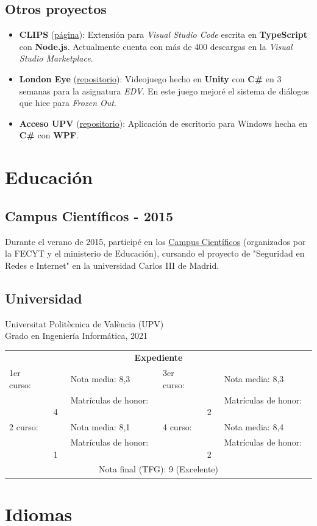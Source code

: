 \documentclass[letterpaper, 12pt, dvipsnames]{article}
\newcommand{\uni}{Universitat Politècnica de València (UPV)}
\newcommand{\grade}[1]{Nota media: #1}
\newcommand{\mh}[1]{Matrículas de honor: #1}
\newcommand{\tabitem}{~~\llap{\textbullet}~~}
\newcommand{\unigrades}[9]{
    \begin{tabular}{|ll<{\hspace{1em}}|>{\hspace{1em}}ll|}
        \hline
        \multicolumn{4}{|c|}{\textbf{Expediente}}\\[.5em]
        1er curso: & \tabitem \grade{#1} & 3er curso: & \tabitem \grade{#5} \\
        & \tabitem \mh{#2} && \tabitem \mh{#6} \\
        2{\textdegree} curso: & \tabitem \grade{#3} & 4{\textdegree} curso: & \tabitem \grade{#7} \\
        & \tabitem \mh{#4} && \tabitem \mh{#8} \\
        \multicolumn{4}{|c|}{\rule{0pt}{1.5em}Nota final (TFG): #9}\\
        \hline
    \end{tabular}
}
\newcommand{\myunigrades}{
    \unigrades
    {8,3}
    {4}
    {8,1}
    {1}
    {8,3}
    {2}
    {8,4}
    {2}
    {9 (Excelente)}
}
\begin{document}
    \vspace{1em}

    \subsection{Otros proyectos}

    \begin{itemize}
        \item \textbf{CLIPS} (\href{https://marketplace.visualstudio.com/items?itemName=algono.clips-ide}{página}): Extensión para \emph{Visual Studio Code} escrita en \textbf{TypeScript} con \textbf{Node.js}. Actualmente cuenta con más de 400 descargas en la \emph{Visual Studio Marketplace}.
        \item \textbf{London Eye} (\href{https://github.com/algono/London-Eye}{repositorio}): Videojuego hecho en \textbf{Unity} con \textbf{C\#} en 3 semanas para la asignatura \emph{EDV}. En este juego mejoré el sistema de diálogos que hice para \emph{Frozen Out}.
        \item \textbf{Acceso UPV} (\href{https://github.com/algono/AccesoUPV}{repositorio}): Aplicación de escritorio para Windows hecha en \textbf{C\#} con \textbf{WPF}.
    \end{itemize}

    \section{Educación}

    \subsection{Campus Científicos - 2015}

    Durante el verano de 2015, participé en los \href{https://www.campuscientificos.es/}{Campus Científicos} (organizados por la FECYT y el ministerio de Educación), cursando el proyecto de "Seguridad en Redes e Internet" en la universidad Carlos III de Madrid.

    \subsection{Universidad}

    {\uni}\\
    Grado en Ingeniería Informática, 2021\\

    \myunigrades

    \section{Idiomas}
\end{document}
